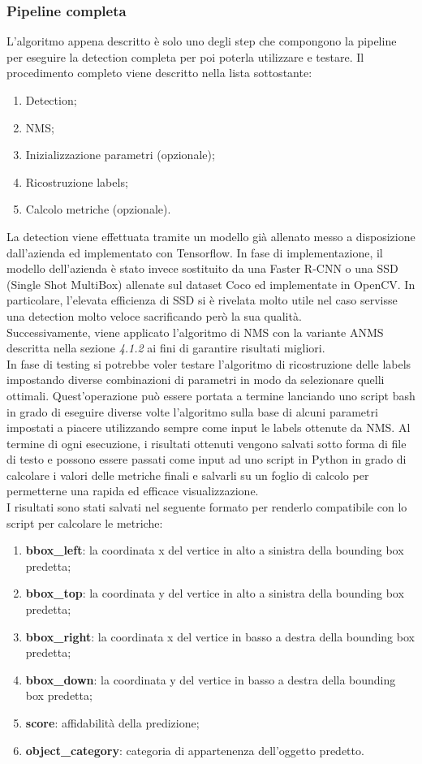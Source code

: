 \subsubsection{Pipeline completa}
L'algoritmo appena descritto è solo uno degli step che compongono la pipeline per eseguire la detection completa per poi poterla utilizzare e testare. Il procedimento completo viene descritto nella lista sottostante:
\begin{enumerate}
\item Detection;
\item NMS;
\item Inizializzazione parametri (opzionale);
\item Ricostruzione labels;
\item Calcolo metriche (opzionale).
\end{enumerate}
La detection viene effettuata tramite un modello già allenato messo a disposizione dall'azienda ed implementato con Tensorflow. In fase di implementazione, il modello dell'azienda è stato invece sostituito da una Faster R-CNN o una SSD (Single Shot MultiBox) allenate sul dataset Coco ed implementate in OpenCV. In particolare, l'elevata efficienza di SSD si è rivelata molto utile nel caso servisse una detection molto veloce sacrificando però la sua qualità.\\
Successivamente, viene applicato l'algoritmo di NMS con la variante ANMS descritta nella sezione \textit{4.1.2} ai fini di garantire risultati migliori.\\
In fase di testing si potrebbe voler testare l'algoritmo di ricostruzione delle labels impostando diverse combinazioni di parametri in modo da selezionare quelli ottimali. Quest'operazione può essere portata a termine lanciando uno script bash in grado di eseguire diverse volte l'algoritmo sulla base di alcuni parametri impostati a piacere utilizzando sempre come input le labels ottenute da NMS. Al termine di ogni esecuzione, i risultati ottenuti vengono salvati sotto forma di file di testo e possono essere passati come input ad uno script in Python in grado di calcolare i valori delle metriche finali e salvarli su un foglio di calcolo per permetterne una rapida ed efficace visualizzazione.\\
I risultati sono stati salvati nel seguente formato per renderlo compatibile con lo script per calcolare le metriche:
\begin{enumerate}
\item \textbf{bbox\_left}: la coordinata x del vertice in alto a sinistra della bounding box predetta;
\item \textbf{bbox\_top}: la coordinata y del vertice in alto a sinistra della bounding box predetta;
\item \textbf{bbox\_right}: la coordinata x del vertice in basso a destra della bounding box predetta;
\item \textbf{bbox\_down}: la coordinata y del vertice in basso a destra della bounding box predetta;
\item \textbf{score}: affidabilità della predizione;
\item \textbf{object\_category}: categoria di appartenenza dell'oggetto predetto.
\end{enumerate}
